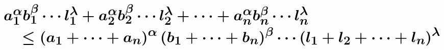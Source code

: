 \documentclass[12pt]{article}
\begin{document}
\thispagestyle{empty}


\vfill
$$
\Huge{\boldsymbol{\splitdfrac{a_{1}^{\alpha} b_{1}^{\beta} \cdots l_{1}^{\lambda}+a_{2}^{\alpha} b_{2}^{\beta} \cdots l_{2}^{\lambda}+\cdots + a_{n}^{\alpha} b_{n}^{\beta} \cdots l_{n}^{\lambda}}{\leq \left( a_{1}+\cdots+a_{n} \right)^{\alpha} \left( b_{1}+\cdots +b_{n}\right)^{\beta}  \cdots \left(l_{1}+l_{2}+\cdots+l_{n}\right)^{\lambda} }}}$$
\vfill
\end{document}
